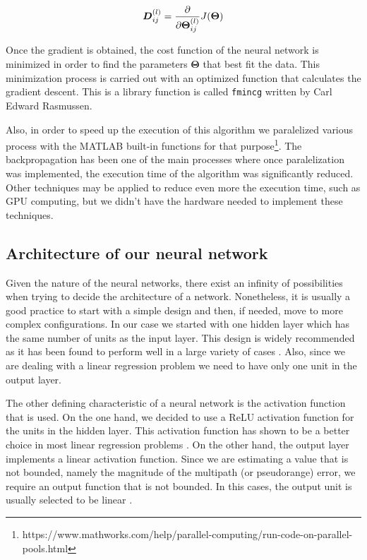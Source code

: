\documentclass[a4paper, report, oneside, UKenglish]{memoir}
\newcommand{\bD}{\boldsymbol{D}}
\newcommand{\bTheta}{\boldsymbol{\Theta}}
\begin{document}
\begin{equation}
    \bD_{ij}^{(l)} = \pdv{}{\bTheta_{ij}^{(l)}} J(\bTheta)
\end{equation}

Once the gradient is obtained, the cost function of the neural network is minimized in order to find the parameters $\bTheta$ that best fit the data. This minimization process is carried out with an optimized function that calculates the gradient descent. This is a library function is called \texttt{fmincg} written by Carl Edward Rasmussen.

Also, in order to speed up the execution of this algorithm we paralelized various process with the MATLAB built-in functions for that purpose\footnote{https://www.mathworks.com/help/parallel-computing/run-code-on-parallel-pools.html}. The backpropagation has been one of the main processes where once paralelization was implemented, the execution time of the algorithm was significantly reduced. Other techniques may be applied to reduce even more the execution time, such as GPU computing, but we didn't have the hardware needed to implement these techniques.

\subsection{Architecture of our neural network}
Given the nature of the neural networks, there exist an infinity of possibilities when trying to decide the architecture of a network. Nonetheless, it is usually a good practice to start with a simple design and then, if needed, move to more complex configurations. In our case we started with one hidden layer which has the same number of units as the input layer. This design is widely recommended as it has been found to perform well in a large variety of cases \cite{aggarwal_neural_2018}. Also, since we are dealing with a linear regression problem we need to have only one unit in the output layer.

The other defining characteristic of a neural network is the activation function that is used. On the one hand, we decided to use a ReLU activation function for the units in the hidden layer. This activation function has shown to be a better choice in most linear regression problems \cite{aggarwal_neural_2018}. On the other hand, the output layer implements a linear activation function. Since we are estimating a value that is not bounded, namely the magnitude of the multipath (or pseudorange) error, we require an output function that is not bounded. In this cases, the output unit is usually selected to be linear \cite{aggarwal_neural_2018}.
\end{document}
